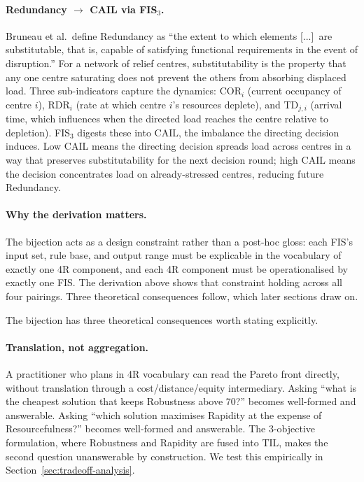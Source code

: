 \documentclass[applsci,article,submit,moreauthors,pdftex]{Definitions/mdpi}
\begin{document}
\paragraph{Redundancy $\to$ CAIL via FIS$_3$.} Bruneau et al.\ define
Redundancy as ``the extent to which elements [...]\ are substitutable,
that is, capable of satisfying functional requirements in the event
of disruption.'' For a network of relief centres, substitutability is
the property that any one centre saturating does not prevent the
others from absorbing displaced load. Three sub-indicators capture
the dynamics: COR$_i$ (current occupancy of centre $i$), RDR$_i$
(rate at which centre $i$'s resources deplete), and TD$_{j,i}$
(arrival time, which influences when the directed load reaches the
centre relative to depletion). FIS$_3$ digests these into CAIL, the
imbalance the directing decision induces. Low CAIL means the
directing decision spreads load across centres in a way that
preserves substitutability for the next decision round; high CAIL
means the decision concentrates load on already-stressed centres,
reducing future Redundancy.

\paragraph{Why the derivation matters.}
The bijection acts as a design constraint rather than a post-hoc gloss: each
FIS's input set, rule base, and output range must be explicable in the
vocabulary of exactly one 4R component, and each 4R component must be
operationalised by exactly one FIS. The derivation above shows that constraint
holding across all four pairings. Three theoretical consequences follow, which
later sections draw on.

\bigskip
The bijection has three theoretical consequences worth stating explicitly.

\paragraph{Translation, not aggregation.} A practitioner who plans in 4R
vocabulary can read the Pareto front directly, without translation through a
cost/distance/equity intermediary. Asking ``what is the cheapest solution
that keeps Robustness above 70?'' becomes well-formed and answerable. Asking
``which solution maximises Rapidity at the expense of Resourcefulness?''
becomes well-formed and answerable. The 3-objective formulation, where
Robustness and Rapidity are fused into TIL, makes the second question
unanswerable by construction. We test this empirically in
Section~\ref{sec:tradeoff-analysis}.
\end{document}
